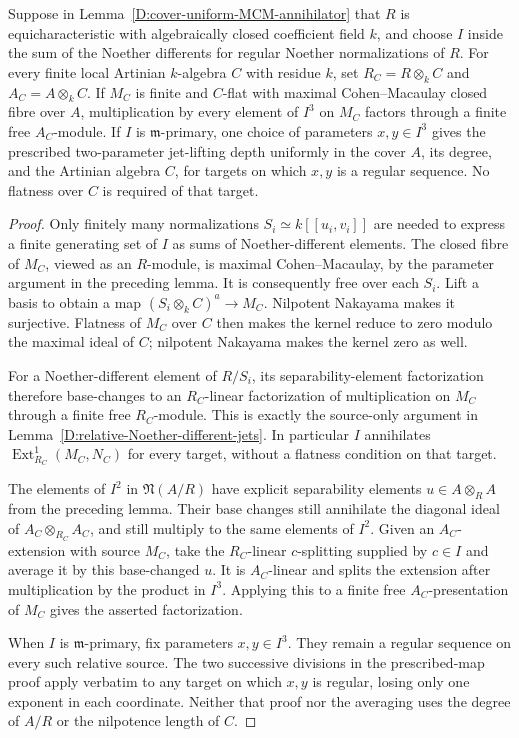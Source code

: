 \begin{corollary}
\label{D:cover-uniform-relative-jets}
Suppose in Lemma~\ref{D:cover-uniform-MCM-annihilator} that $R$ is
equicharacteristic with algebraically closed coefficient field $k$,
and choose $I$ inside the sum of the Noether differents for regular
Noether normalizations of $R$. For every finite local Artinian
$k$-algebra $C$ with residue $k$, set $R_C=R\otimes_k C$ and
$A_C=A\otimes_k C$. If $M_C$ is finite and $C$-flat with
maximal Cohen--Macaulay closed fibre over $A$, multiplication by
every element of $I^3$ on $M_C$ factors through a finite free
$A_C$-module. If $I$ is $\mathfrak m$-primary, one choice of parameters $x,y\in I^3$ gives
the prescribed two-parameter jet-lifting depth uniformly in the
cover $A$, its degree, and the Artinian algebra $C$, for targets
on which $x,y$ is a regular sequence. No flatness over $C$ is
required of that target.
\end{corollary}
\begin{proof}
Only finitely many normalizations $S_i\simeq k[[u_i,v_i]]$ are
needed to express a finite generating set of $I$ as sums of
Noether-different elements. The closed fibre of $M_C$, viewed as
an $R$-module, is maximal Cohen--Macaulay, by the parameter argument
in the preceding lemma. It is consequently free over each $S_i$.
Lift a basis to obtain a map $(S_i\otimes_k C)^a\to M_C$.
Nilpotent Nakayama makes it surjective. Flatness of $M_C$ over $C$
then makes the kernel reduce to zero modulo the maximal ideal of
$C$; nilpotent Nakayama makes the kernel zero as well.

For a Noether-different element of $R/S_i$, its separability-element
factorization therefore base-changes to an $R_C$-linear factorization
of multiplication on $M_C$ through a finite free $R_C$-module. This
is exactly the source-only argument in
Lemma~\ref{D:relative-Noether-different-jets}. In particular $I$
annihilates $\operatorname{Ext}^1_{R_C}(M_C,N_C)$ for every target,
without a flatness condition on that target.

The elements of $I^2$ in $\mathfrak N(A/R)$ have explicit
separability elements $u\in A\otimes_R A$ from the preceding
lemma. Their base changes still annihilate the diagonal ideal of
$A_C\otimes_{R_C}A_C$, and still multiply to the same elements of
$I^2$. Given an $A_C$-extension with source $M_C$, take the
$R_C$-linear $c$-splitting supplied by $c\in I$ and average it by
this base-changed $u$. It is $A_C$-linear and splits the extension
after multiplication by the product in $I^3$. Applying this to a
finite free $A_C$-presentation of $M_C$ gives the asserted
factorization.

When $I$ is $\mathfrak m$-primary, fix parameters $x,y\in I^3$.
They remain a regular sequence on every such relative source.
The two successive divisions in the prescribed-map proof apply
verbatim to any target on which $x,y$ is regular, losing only
one exponent in each coordinate. Neither that proof nor the
averaging uses the degree of $A/R$ or the nilpotence length of $C$.
\end{proof}
